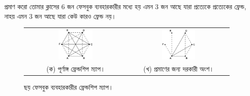 \begin{example}[label=php-six-facebook-users-example]
	প্রমাণ করো তোমার ক্লাসের $6$ জন ফেসবুক ব্যবহারকারীর মধ্যে হয় এমন $3$ জন আছে যারা প্রত্যেকে প্রত্যেকের ফ্রেন্ড, নাহয় এমন $3$ জন আছে যারা কেউ কারও ফ্রেন্ড নয়।
\end{example}
\begin{figure}[hbt]
	\centering
	\begin{tabular}{cc}
	\includegraphics[width=0.35\textwidth]{img/pigeonhole_principle/six-facebook-users-full}
	&
	\includegraphics[width=0.35\textwidth]{img/pigeonhole_principle/six-facebook-users-partial}\\
	(ক) পূর্ণাঙ্গ ফ্রেন্ডশিপ ম্যাপ। & (খ) প্রমাণের জন্য দরকারী অংশ।
	\end{tabular}
	\caption{ছয় ফেসবুক ব্যবহারকারীর ফ্রেন্ডশিপ ম্যাপ।}
	\label{php-six-facebook-users}
\end{figure}
